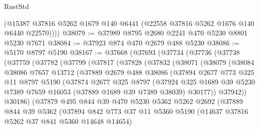 \begin{lexlean}{RustStd}
\begin{coremodule}
        (@15387 @37816 @5262 @1679 @140 @6441 (@22558 @37816 @5262 @1676 @140 @6440 @22570))))
@38079 := @37989 @8795 @2680 @2241 @470 @5230 @8801 @5230 @7671
@38084 := @37923 @874 @470 @2679 @488 @5230
@38086 := @5170 @8797 @5190
@38167 := @37668
    (@37693
      (@37734
        (@37736
          (@37738
            (@37759
              (@37782
                (@37799
                  (@37817
                    (@37828
                      (@37832
                        (@38071
                          (@38079
                            (@38084
                              @38086
                              @7657
                              @13712
                              (@37889
                                @2679
                                @488
                                @38086
                                (@37894
                                  @2677
                                  @773
                                  @325
                                  @11
                                  @8797
                                  @5190
                                  (@37874
                                    @2677
                                    @325
                                    @8797
                                    (@37924
                                      @325
                                      @1689
                                      @39
                                      @5230
                                      @7389
                                      @7659
                                      @16053
                                      (@37889 @1689 @39 @7389 @38039)
                                      @30177))
                                  @37942))
                              @30186)
                            (@37879
                              @495
                              @844
                              @39
                              @470
                              @5230
                              @5362
                              @5262
                              @2692
                              (@37889
                                @844
                                @39
                                @5362
                                (@37894
                                  @842
                                  @773
                                  @37
                                  @11
                                  @5360
                                  @5190
                                  (@14637 @37816 @5262 @37 @841 @5360 @14648 @14654)

\end{coremodule}
\end{lexlean}
